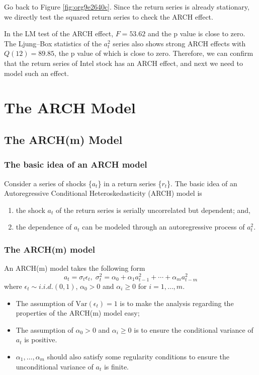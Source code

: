 \documentclass[a4paper,11pt]{article}
\newcommand{\var}{\mathrm{Var}}
\begin{document}
Go back to Figure \ref{fig:org9e2640c}. Since the return series is
already stationary, we directly test the squared return series to
check the ARCH effect.

In the LM test of the ARCH effect, \(F = 53.62\) and the p value is
close to zero. The Ljung–Box statistics of the \(a^2_t\) series also
shows strong ARCH effects with \(Q(12) = 89.85\), the p value of which is
close to zero. Therefore, we can confirm that the return series of
Intel stock has an ARCH effect, and next we need to model such an
effect.


\section{The ARCH Model}
\label{sec:org39c6158}

\subsection{The ARCH(m) Model}
\label{sec:org83607b9}

\subsubsection*{The basic idea of an ARCH model}
\label{sec:orgbe1ab68}

Consider a series of shocks \{\(a_t\)\} in a return series \{\(r_t\)\}. The
basic idea of an Autoregressive Conditional Heteroskedasticity (ARCH)
model is
\begin{enumerate}
\item the shock \(a_t\) of the return series is serially uncorrelated but
dependent; and,
\item the dependence of \(a_t\) can be modeled through an autoregressive
process of \(a^2_t\).
\end{enumerate}

\subsubsection*{The ARCH(m) model}
\label{sec:orgd406cde}

An ARCH(m) model takes the following form
\begin{equation}
\label{eq:archm}
a_t = \sigma_t \epsilon_t,\; \sigma^2_t = \alpha_0 + \alpha_1 a^2_{t-1} + \cdots + \alpha_m a^2_{t-m}
\end{equation}
where \(\epsilon_t \sim i.i.d.(0, 1)\), \(\alpha_0 > 0\) and \(\alpha_i
\geq 0\) for \(i=1, \ldots, m\).
\begin{itemize}
\item The assumption of \(\var(\epsilon_t)=1\) is to make the analysis
regarding the properties of the ARCH(m) model easy;
\item The assumption of \(\alpha_0 > 0\) and \(\alpha_i \geq 0\) is to ensure
the conditional variance of \(a_t\) is positive.
\item \(\alpha_1, \ldots, \alpha_m\) should also satisfy some regularity
conditions to ensure the unconditional variance of \(a_t\) is finite.
\end{itemize}
\end{document}
